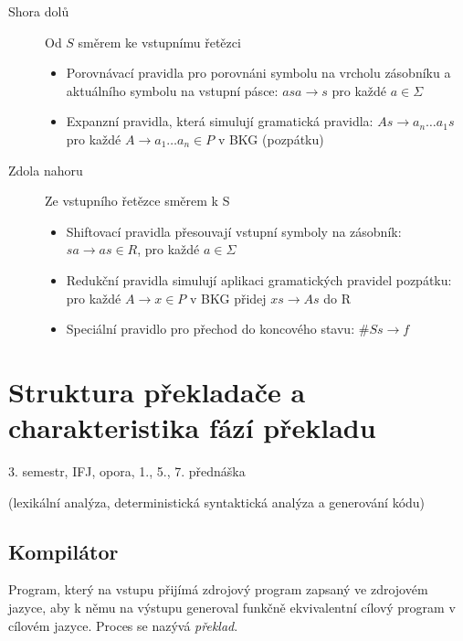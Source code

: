 \documentclass[a4paper, 11pt]{report}
\begin{document}
\begin{description}
	\item[Shora dolů] Od $S$ směrem ke vstupnímu řetězci
	\begin{itemize}
		\item Porovnávací pravidla pro porovnáni symbolu na vrcholu zásobníku a aktuálního symbolu na vstupní pásce: $asa \to s$ pro každé $a \in \Sigma$
		\item Expanzní pravidla, která simulují gramatická pravidla: $As \to a_n \dots a_1s$ pro každé $A \to a_1 \dots a_n \in P$ v BKG (pozpátku)
	\end{itemize}
	\item[Zdola nahoru] Ze vstupního řetězce směrem k S
	\begin{itemize}
		\item Shiftovací pravidla přesouvají vstupní symboly na zásobník: $sa \to as \in R$, pro každé $a \in \Sigma$
		\item Redukční pravidla simulují aplikaci gramatických pravidel pozpátku: pro každé $A \to x \in P$ v BKG přidej $xs \to As$ do R
		\item Speciální pravidlo pro přechod do koncového stavu: $\#Ss \to f$
	\end{itemize}
\end{description}




























\chapter{Struktura překladače a charakteristika fází překladu} \label{cha:22}

3. semestr, IFJ, opora, 1., 5., 7. přednáška

(lexikální analýza, deterministická syntaktická analýza a generování kódu)


\section{Kompilátor}
Program, který na vstupu přijímá zdrojový program zapsaný ve zdrojovém jazyce, aby k němu na výstupu generoval funkčně ekvivalentní cílový program v cílovém jazyce. Proces se nazývá \emph{překlad}.
\end{document}
